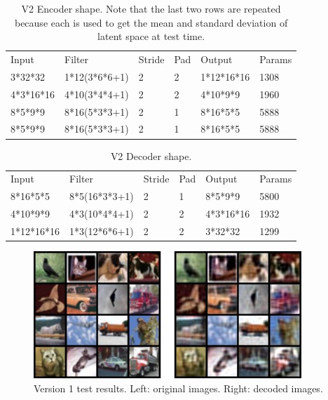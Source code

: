 \documentclass[10pt]{article}
\begin{document}
\begin{table}
\begin{tabular}{|l|l|l|l|l|l|}
Input & Filter & Stride & Pad & Output & Params\\
3*32*32		&1*12(3*6*6+1)		&2	&2	&1*12*16*16	&1308\\
4*3*16*16	&4*10(3*4*4+1)		&2	&2	&4*10*9*9	&1960\\
8*5*9*9		&8*16(5*3*3+1)		&2	&1	&8*16*5*5	&5888\\
8*5*9*9		&8*16(5*3*3+1)		&2	&1	&8*16*5*5	&5888\\
\end{tabular}
\caption{\label{tab:table-name}V2 Encoder shape. Note that the last two rows are repeated because each is used to get the mean and standard deviation of latent space at test time.}
\end{table}

\begin{table}
\begin{tabular}{|l|l|l|l|l|l|}
Input & Filter & Stride & Pad & Output & Params\\
8*16*5*5	&8*5(16*3*3+1)		&2	&1&	8*5*9*9		&5800\\
4*10*9*9	&4*3(10*4*4+1)		&2	&2	&4*3*16*16	&1932\\
1*12*16*16	&1*3(12*6*6+1)		&2	&2	&3*32*32		&1299\\
\end{tabular}
\caption{\label{tab:table-name}V2 Decoder shape.}
\end{table}

\begin{center}
\begin{figure}
\caption{Version 1 test results. Left: original images. Right: decoded images.}
\includegraphics[width=0.9\textwidth]{20220530 1 v1.PNG}
\end{figure}
\end{center}
\end{document}
